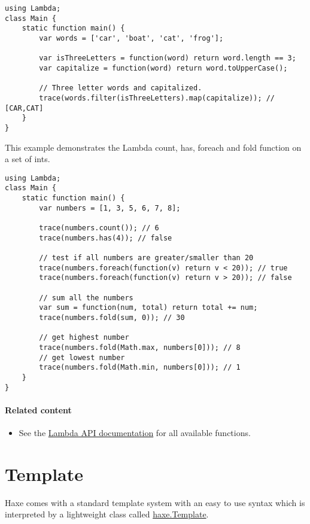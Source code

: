 \begin{lstlisting}
using Lambda;
class Main {
    static function main() {
        var words = ['car', 'boat', 'cat', 'frog'];

        var isThreeLetters = function(word) return word.length == 3;
        var capitalize = function(word) return word.toUpperCase();

        // Three letter words and capitalized. 
        trace(words.filter(isThreeLetters).map(capitalize)); // [CAR,CAT]
    }
}
\end{lstlisting} 

This example demonstrates the Lambda count, has, foreach and fold function on a set of ints.

\begin{lstlisting}
using Lambda;
class Main {
    static function main() {
        var numbers = [1, 3, 5, 6, 7, 8];

        trace(numbers.count()); // 6
        trace(numbers.has(4)); // false

        // test if all numbers are greater/smaller than 20
        trace(numbers.foreach(function(v) return v < 20)); // true
        trace(numbers.foreach(function(v) return v > 20)); // false

        // sum all the numbers
        var sum = function(num, total) return total += num;
        trace(numbers.fold(sum, 0)); // 30

        // get highest number
        trace(numbers.fold(Math.max, numbers[0])); // 8
        // get lowest number
        trace(numbers.fold(Math.min, numbers[0])); // 1
    }
}
\end{lstlisting} 

\paragraph{Related content}
\begin{itemize}
	\item See the \href{https://api.haxe.org/Lambda.html}{Lambda API documentation} for all available functions.
\end{itemize}


\section{Template}
\label{std-template}

Haxe comes with a standard template system with an easy to use syntax which is interpreted by a lightweight class called \href{https://api.haxe.org/haxe/Template.html}{haxe.Template}.


